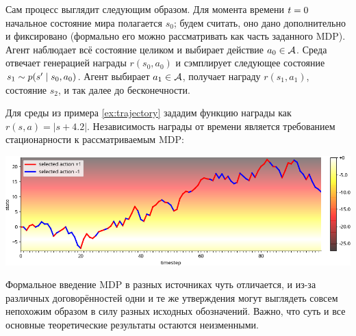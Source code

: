 Сам процесс выглядит следующим образом. Для момента времени $t \HM= 0$ начальное состояние мира полагается $s_0$; будем считать, оно дано дополнительно и фиксировано (формально его можно рассматривать как часть заданного MDP). Агент наблюдает всё состояние целиком и выбирает действие $a_0 \HM\in \A$. Среда отвечает генерацией награды $r(s_0, a_0)$ и сэмплирует следующее состояние $s_1 \HM\sim p(s' \HM\mid s_0, a_0)$. Агент выбирает $a_1 \HM\in \A$, получает награду $r(s_1, a_1)$, состояние $s_2$, и так далее до бесконечности.

\begin{example}
Для среды из примера \ref{ex:trajectory} зададим функцию награды как $r(s, a) = |s + 4.2|$. Независимость награды от времени является требованием стационарности к рассматриваемым MDP:
\begin{center}
\includegraphics[width=\textwidth]{Images/traj_rew.png}
\end{center}
\end{example}

Формальное введение MDP в разных источниках чуть отличается, и из-за различных договорённостей одни и те же утверждения могут выглядеть совсем непохожим образом в силу разных исходных обозначений. Важно, что суть и все основные теоретические результаты остаются неизменными.

